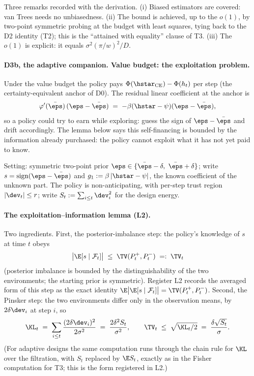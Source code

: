 Three remarks recorded with the derivation. (i) Biased estimators are
covered: van Trees needs no unbiasedness. (ii) The bound is achieved, up to
the $o(1)$, by two-point symmetric probing at the budget with least squares,
tying back to the D2 identity (T2); this is the ``attained with equality''
clause of T3. (iii) The $o(1)$ is explicit: it equals
$\sigma^2(\pi/w)^2/D$.

\paragraph{D3b, the adaptive companion. Value budget: the exploitation problem.}
Under the value budget the policy pays
$\Phi(\hstar_{\mathrm{CE}})-\Phi(h_t)$ per step (the certainty-equivalent
anchor of D0). The residual linear coefficient at the anchor is
\begin{equation*}
\varphi'(\bar\eps)\,(\eps-\bar\eps)
\;=\; -\beta(\hstar-\psi)(\eps-\bar\eps),
\end{equation*}
so a policy could try to earn while exploring: guess the sign of
$\eps-\bar\eps$ and drift accordingly. The lemma below says this
self-financing is bounded by the information already purchased: the policy
cannot exploit what it has not yet paid to know.

Setting: symmetric two-point prior
$\eps\in\{\bar\eps-\delta,\ \bar\eps+\delta\}$; write
$s=\operatorname{sign}(\eps-\bar\eps)$ and
$g_1 := \beta\,|\hstar-\psi|$, the known coefficient of the unknown part.
The policy is non-anticipating, with per-step trust region $|\dev_t|\le r$;
write $S_t := \sum_{i\le t}\dev_i^2$ for the design energy.

\paragraph{The exploitation--information lemma (L2).}
Two ingredients. First, the posterior-imbalance step: the policy's knowledge
of $s$ at time $t$ obeys
\begin{equation*}
\big|\E[s\mid\mathcal{F}_t]\big| \;\le\; \TV(P^+_t,P^-_t) \;=:\; \TV_t
\end{equation*}
(posterior imbalance is bounded by the distinguishability of the two
environments; the starting prior is symmetric). Register L2 records the
averaged form of this step as the exact identity
$\E\big|\E[s\mid\mathcal{F}_t]\big| = \TV(P^+_t,P^-_t)$. Second, the
Pinsker step: the two environments differ only in the observation means, by
$2\delta\dev_i$ at step $i$, so
\begin{equation*}
\KL_t \;=\; \sum_{i\le t}\frac{(2\delta\dev_i)^2}{2\sigma^2}
\;=\; \frac{2\delta^2 S_t}{\sigma^2},
\qquad
\TV_t \;\le\; \sqrt{\KL_t/2} \;=\; \frac{\delta\sqrt{S_t}}{\sigma}.
\end{equation*}
(For adaptive designs the same computation runs through the chain rule for
$\KL$ over the filtration, with $S_t$ replaced by $\E S_t$, exactly as in the
Fisher computation for T3; this is the form registered in L2.)

